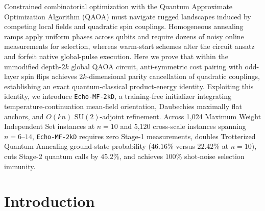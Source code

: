 \documentclass[10pt,a4paper]{article}
\begin{document}
\makencstitle


\begin{ncsabstract}

Constrained combinatorial optimization with the Quantum Approximate Optimization Algorithm (QAOA) must navigate rugged landscapes induced by competing local fields and quadratic spin couplings. Homogeneous annealing ramps apply uniform phases across qubits and require dozens of noisy online measurements for selection, whereas warm-start schemes alter the circuit ansatz and forfeit native global-pulse execution. Here we prove that within the unmodified depth-$2k$ global QAOA circuit, anti-symmetric cost pairing with odd-layer spin flips achieves $2k$-dimensional parity cancellation of quadratic couplings, establishing an exact quantum-classical product-energy identity. Exploiting this identity, we introduce \texttt{Echo-MF-2kD}, a training-free initializer integrating temperature-continuation mean-field orientation, Daubechies maximally flat anchors, and $O(kn)$ $\mathrm{SU}(2)$-adjoint refinement. Across 1,024 Maximum Weight Independent Set instances at $n=10$ and 5,120 cross-scale instances spanning $n=6\mbox{--}14$, \texttt{Echo-MF-2kD} requires zero Stage-1 measurements, doubles Trotterized Quantum Annealing ground-state probability ($46.16\%$ versus $22.42\%$ at $n=10$), cuts Stage-2 quantum calls by $45.2\%$, and achieves $100\%$ shot-noise selection immunity.

\end{ncsabstract}

\section*{Introduction}
\end{document}
